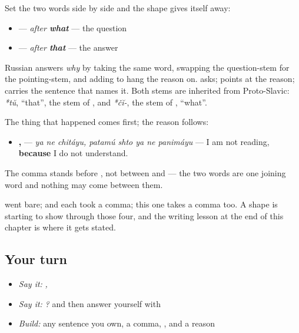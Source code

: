 Set the two words side by side and the shape gives itself away:

\begin{itemize}
\raggedright
  \item \textbf{} — \emph{after \textbf{what}} — the question
  \item \textbf{} — \emph{after \textbf{that}} — the answer
\end{itemize}

Russian answers \emph{why} by taking the same word, swapping the question-stem for the pointing-stem, and adding \textbf{} to hang the reason on. \textbf{} asks; \textbf{ } points at the reason; \textbf{} carries the sentence that names it. Both stems are inherited from Proto-Slavic: \emph{*tŭ}, \textquotedblleft{}that\textquotedblright{}, the stem of \emph{}, and \emph{*čĭ-}, the stem of \emph{}, \textquotedblleft{}what\textquotedblright{}.

\begin{grammarlens}[title={Grammar lens — where the halves go, and where the comma goes}]
The thing that happened comes first; the reason follows:

\begin{itemize}
\raggedright
  \item \textbf{  ,     } — \emph{ya ne chitáyu, patamú shto ya ne panimáyu} — I am not reading, \textbf{because} I do not understand.
\end{itemize}

The comma stands before \textbf{}, not between \textbf{} and \textbf{} — the two words are one joining word and nothing may come between them.

\textbf{} went bare; \textbf{} and \textbf{} each took a comma; this one takes a comma too. A shape is starting to show through those four, and the writing lesson at the end of this chapter is where it gets stated.
\end{grammarlens}

\subsection*{Your turn}
\begin{itemize}
\raggedright
  \item \emph{Say it:} \emph{  ,     }
  \item \emph{Say it:} \emph{?} and then answer yourself with \textbf{ }
  \item \emph{Build:} any sentence you own, a comma, \textbf{ }, and a reason
\end{itemize}

